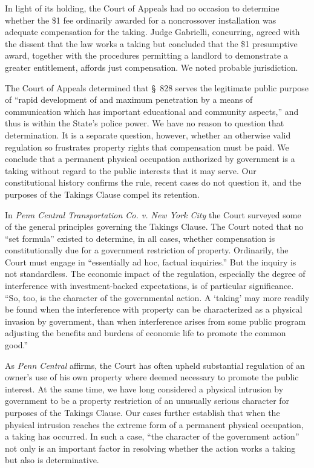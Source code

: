 In light of its holding, the Court of Appeals had no occasion to determine
whether the \$1 fee ordinarily awarded for a noncrossover installation was
adequate compensation for the taking. Judge Gabrielli, concurring, agreed with
the dissent that the law works a taking but concluded that the \$1 presumptive
award, together with the procedures permitting a landlord to demonstrate a
greater entitlement, affords just compensation. We noted probable jurisdiction. 



The Court of Appeals determined that \S~828 serves the legitimate public purpose
of ``rapid development of and maximum penetration by a means of communication
which has important educational and community aspects,'' and thus is within the
State's police power. We have no reason to question that determination. It is a
separate question, however, whether an otherwise valid regulation so frustrates
property rights that compensation must be paid. We conclude that a permanent
physical occupation authorized by government is a taking without regard to the
public interests that it may serve. Our constitutional history confirms the
rule, recent cases do not question it, and the purposes of the Takings Clause
compel its retention.



In \textit{Penn Central Transportation Co. v. New York City} the Court surveyed
some of the general principles governing the Takings Clause. The Court noted
that no ``set formula'' existed to determine, in all cases, whether compensation
is constitutionally due for a government restriction of property. Ordinarily,
the Court must engage in ``essentially ad hoc, factual inquiries.'' But the
inquiry is not standardless. The economic impact of the regulation, especially
the degree of interference with investment-backed expectations, is of particular
significance. ``So, too, is the character of the governmental action. A `taking'
may more readily be found when the interference with property can be
characterized as a physical invasion by government, than when interference
arises from some public program adjusting the benefits and burdens of economic
life to promote the common good.'' 

As \textit{Penn Central} affirms, the Court has often upheld substantial
regulation of an owner's use of his own property where deemed necessary to
promote the public interest. At the same time, we have long considered a
physical intrusion by government to be a property restriction of an unusually
serious character for purposes of the Takings Clause. Our cases further
establish that when the physical intrusion reaches the extreme form of a
permanent physical occupation, a taking has occurred. In such a case, ``the
character of the government action'' not only is an important factor in
resolving whether the action works a taking but also is determinative.

